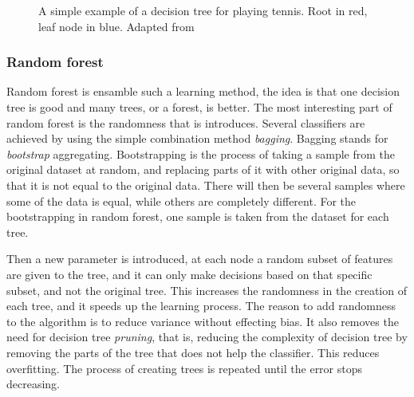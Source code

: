 \begin{figure}
\caption{A simple example of a decision tree for playing tennis. Root in red, leaf node in blue. Adapted from \cite{fig:decision_tree}}
\label{fig:decision_tree}
\end{figure}



\subsubsection{Random forest}
Random forest is ensamble such a learning method, the idea is that one decision tree is good and many trees, or a forest, is better. The most interesting part of random forest is the randomness that is introduces. Several classifiers are achieved by using the simple combination method \textit{bagging}. Bagging stands for \textit{bootstrap} aggregating. Bootstrapping is the process of taking a sample from the original dataset at random, and replacing parts of it with other original data, so that it is not equal to the original data. There will then be several samples where some of the data is equal, while others are completely different. For the bootstrapping in random forest, one sample is taken from the dataset for each tree. 

Then a new parameter is introduced, at each node a random subset of features are given to the tree, and it can only make decisions based on that specific subset, and not the original tree. This increases the randomness in the creation of each tree, and it speeds up the learning process. The reason to add randomness to the algorithm is to reduce variance without effecting bias. It also removes the need for decision tree \textit{pruning}, that is, reducing the complexity of decision tree by removing the parts of the tree that does not help the classifier. This reduces overfitting. The process of creating trees is repeated until the error stops decreasing. 

